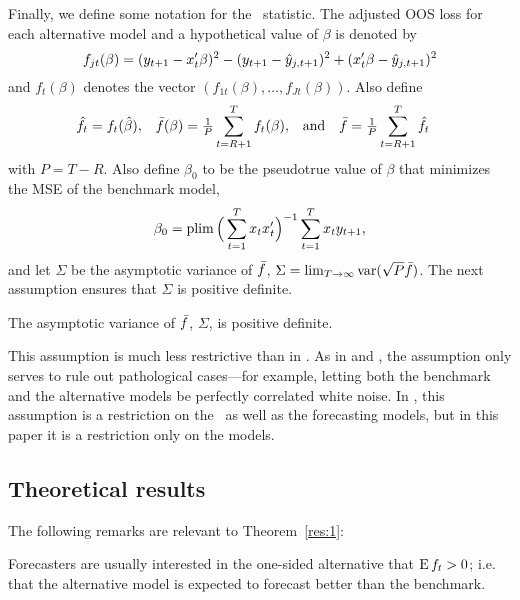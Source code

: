 \documentclass[12pt,fleqn]{article}
\begin{document}
Finally, we define some notation for the \oos\ statistic. The
adjusted OOS loss for each alternative model and a hypothetical value
of $\beta$ is denoted by
\begin{equation}
  f_{jt}(\beta) = (y_{t+1} - x_t'\beta)^2
  - (y_{t+1} - \hat{y}_{j,t+1})^2 + (x_t'\beta - \hat{y}_{j,t+1})^2
\end{equation}
and $f_t(\beta)$ denotes the vector $(f_{1t}(\beta),\dots,f_{Jt}(\beta))$.
Also define
\begin{align*}
  \hat{f}_t &= f_t(\hat{\beta}),
  &\bar{f}(\beta) &= \tfrac{1}{P} \sum_{t=R+1}^T f_t(\beta),
  &\text{and}&
  &\bar{f} &= \tfrac1P \sum_{t=R+1}^{T} \hat{f}_t
\end{align*}
with $P = T - R$. Also define $\beta_0$ to be the pseudotrue value of
$\beta$ that minimizes the MSE of the benchmark model,
\begin{equation*}
  \btrue = \plim \Big( \sum_{t=1}^T x_t x_t' \Big)^{-1} \sum_{t=1}^T x_t y_{t+1},
\end{equation*}
and let $\Sigma$ be the asymptotic variance of $\bar{f}$, $\Sigma
= \lim_{T \to \infty} \operatorname{var}(\sqrt{P} \bar{f})$.
The next assumption ensures that $\Sigma$ is positive definite.
\begin{asmp}\label{a4}%
  The asymptotic variance of $\bar{f}$, $\Sigma$, is positive definite.
\end{asmp}

This assumption is much less restrictive than in \cite{Wes:96}.  As in
\cite{GiW:06} and \citet{ClW:06,ClW:07}, the assumption only serves to
rule out pathological cases---for example, letting both the benchmark
and the alternative models be perfectly correlated white noise. In
\citet{Wes:96}, this assumption is a restriction on the \dgp\ as well
as the forecasting models, but in this paper it is a restriction only
on the models.

\subsection{Theoretical results}
\label{sec:1b}

\begin{thm}\label{res:1}\end{thm}

The following remarks are relevant to Theorem~\ref{res:1}:

\begin{rem}
  Forecasters are usually interested in the one-sided alternative that
  $\operatorname{E} f_t > 0$; i.e. that the alternative model is expected
  to forecast better than the benchmark.
\end{rem}
\end{document}
